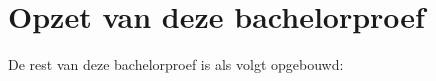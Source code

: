 


\section{Opzet van deze bachelorproef}
\label{sec:opzet-bachelorproef}


De rest van deze bachelorproef is als volgt opgebouwd:

